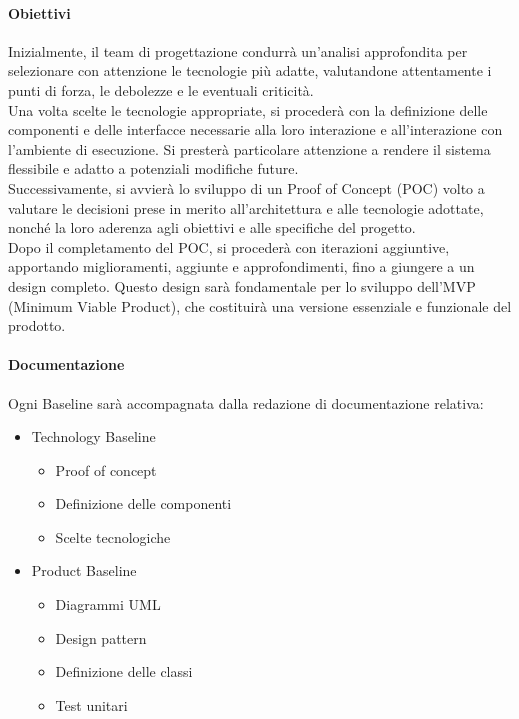 \paragraph{Obiettivi}
Inizialmente, il team di progettazione condurrà un'analisi approfondita per selezionare con attenzione le tecnologie più adatte, valutandone attentamente i punti di forza, le debolezze e le eventuali criticità. \\
Una volta scelte le tecnologie appropriate, si procederà con la definizione delle componenti e delle interfacce necessarie alla loro interazione e all’interazione con l’ambiente di esecuzione. Si presterà particolare attenzione a rendere il sistema flessibile e adatto a potenziali modifiche future. \\
Successivamente, si avvierà lo sviluppo di un Proof of Concept (POC) volto a valutare le decisioni prese in merito all'architettura e alle tecnologie adottate, nonché la loro aderenza agli obiettivi e alle specifiche del progetto. \\
Dopo il completamento del POC, si procederà con iterazioni aggiuntive, apportando miglioramenti, aggiunte e approfondimenti, fino a giungere a un design completo. Questo design sarà fondamentale per lo sviluppo dell'MVP (Minimum Viable Product), che costituirà una versione essenziale e funzionale del prodotto.



\paragraph{Documentazione}
Ogni Baseline sarà accompagnata dalla redazione di documentazione relativa:
\begin{itemize}
    \item Technology Baseline
    \begin{itemize}
        \item Proof of concept
        \item Definizione delle componenti
        \item Scelte tecnologiche
    \end{itemize}
    \item Product Baseline
    \begin{itemize}
        \item Diagrammi UML
        \item Design pattern
        \item Definizione delle classi
        \item Test unitari
    \end{itemize}
\end{itemize}

